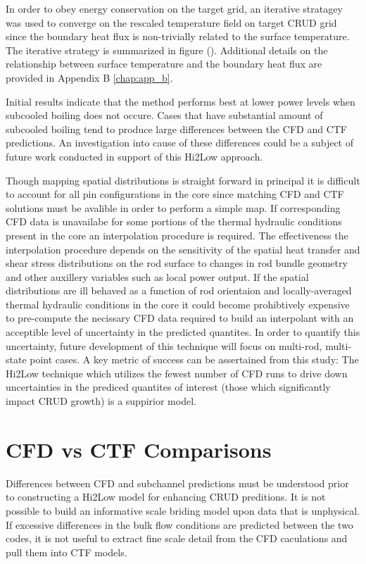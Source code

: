 In order to obey energy conservation on the target grid,  an iterative stratagey was used to converge on the rescaled temperature field on target CRUD grid since the boundary heat flux is non-trivially related to the surface temperature.  The iterative strategy is summarized in figure (). 
Additional details on the relationship between surface temperature and the boundary heat flux are provided in Appendix B \ref{chap:app_b}.

Initial results indicate that the method performs best at lower power levels when subcooled boiling does not occure.  Cases that have substantial amount of subcooled boiling tend to produce large differences between the CFD and CTF predictions.  An investigation into cause of these differences could be a subject of future work conducted in support of this Hi2Low approach.  

Though mapping spatial distributions is straight forward in principal it is difficult to account for all pin configurations in the core since matching CFD and CTF solutions must be avalible in order to perform a simple map.  If corresponding CFD data is unavailabe for some portions of the thermal hydraulic conditions present in the core an interpolation procedure is required.  The effectiveness the interpolation procedure depends on the sensitivity of the spatial heat transfer and shear stress distributions on the rod surface to changes in rod bundle geometry and other auxillery variables such as local power output.  If the spatial distributions are ill behaved as a function of rod orientaion and locally-averaged thermal hydraulic conditions in the core it could become prohibtively expensive to pre-compute the necissary CFD data required to build an interpolant with an acceptible level of uncertainty in the predicted quantites.  In order to quantify this uncertainty, future development of this technique will focus on multi-rod, multi-state point cases.
A key metric of success can be assertained from this study:  The Hi2Low technique which utilizes the fewest number of CFD runs to drive down uncertainties in the prediced quantites of interest (those which significantly impact CRUD growth) is a suppirior model.

\section{CFD vs CTF Comparisons}

Differences between CFD and subchannel predictions must be understood prior to constructing a Hi2Low model for enhancing CRUD preditions.  It is not possible to build an informative scale briding model upon data that is unphysical.  If excessive differences in the bulk flow conditions are predicted between the two codes, it is not useful to extract fine scale detail from the CFD caculations and pull them into CTF models. 

